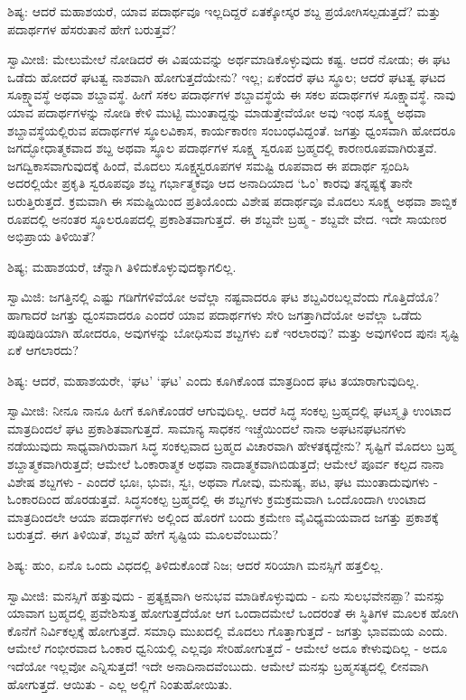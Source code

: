 ಶಿಷ್ಯ: ಆದರೆ ಮಹಾಶಯರೆ, ಯಾವ ಪದಾರ್ಥವೂ ಇಲ್ಲದಿದ್ದರೆ ಏತಕ್ಕೋಸ್ಕರ ಶಬ್ದ ಪ್ರಯೋಗಿಸಲ್ಪಡುತ್ತದೆ? ಮತ್ತು ಪದಾರ್ಥಗಳ ಹೆಸರುತಾನೆ ಹೇಗೆ ಬರುತ್ತವೆ?

ಸ್ವಾಮೀಜಿ: ಮೇಲುಮೇಲೆ ನೋಡಿದರೆ ಈ ವಿಷಯವನ್ನು ಅರ್ಥಮಾಡಿಕೊಳ್ಳುವುದು ಕಷ್ಟ. ಆದರೆ ನೋಡು; ಈ ಘಟ ಒಡೆದು ಹೋದರೆ ಘಟತ್ವ ನಾಶವಾಗಿ ಹೋಗುತ್ತದೆಯೇನು? ಇಲ್ಲ; ಏಕೆಂದರೆ ಘಟ ಸ್ಥೂಲ; ಆದರೆ ಘಟತ್ವ ಘಟದ ಸೂಕ್ಷ್ಮಾವಸ್ಥೆ ಅಥವಾ ಶಬ್ದಾವಸ್ಥೆ. ಹೀಗೆ ಸಕಲ ಪದಾರ್ಥಗಳ ಶಬ್ದಾವಸ್ಥೆಯೆ ಈ ಸಕಲ ಪದಾರ್ಥಗಳ ಸೂಕ್ಷ್ಮಾವಸ್ಥೆ. ನಾವು ಯಾವ ಪದಾರ್ಥಗಳನ್ನು ನೋಡಿ ಕೇಳಿ ಮುಟ್ಟಿ ಮುಂತಾದ್ದನ್ನು ಮಾಡುತ್ತೇವೆಯೋ ಅವು ಇಂಥ ಸೂಕ್ಷ್ಮ ಅಥವಾ ಶಬ್ದಾವಸ್ಥೆಯಲ್ಲಿರುವ ಪದಾರ್ಥಗಳ ಸ್ಥೂಲವಿಕಾಸ, ಕಾರ್ಯಕಾರಣ ಸಂಬಂಧವಿದ್ದಂತೆ. ಜಗತ್ತು ಧ್ವಂಸವಾಗಿ ಹೋದರೂ ಜಗದ್ಭೋಧಾತ್ಮಕವಾದ ಶಬ್ದ ಅಥವಾ ಸ್ಥೂಲ ಪದಾರ್ಥಗಳ ಸೂಕ್ಷ್ಮ ಸ್ವರೂಪ ಬ್ರಹ್ಮದಲ್ಲಿ ಕಾರಣರೂಪವಾಗಿರುತ್ತವೆ. ಜಗದ್ವಿಕಾಸವಾಗುವುದಕ್ಕೆ ಹಿಂದೆ, ಮೊದಲು ಸೂಕ್ಷ್ಮಸ್ವರೂಪಗಳ ಸಮಷ್ಟಿ ರೂಪವಾದ ಈ ಪದಾರ್ಥ ಸ್ಪಂದಿಸಿ ಅದರಲ್ಲಿಯೇ ಪ್ರಕೃತಿ ಸ್ವರೂಪವೂ ಶಬ್ದ ಗರ್ಭಾತ್ಮಕವೂ ಆದ ಅನಾದಿಯಾದ ‘ಓಂ’ ಕಾರವು ತನ್ನಷ್ಟಕ್ಕೆ ತಾನೇ ಬರುತ್ತಿರುತ್ತದೆ. ಕ್ರಮವಾಗಿ ಈ ಸಮಷ್ಟಿಯಿಂದ ಪ್ರತಿಯೊಂದು ವಿಶೇಷ ಪದಾರ್ಥವೂ ಮೊದಲು ಸೂಕ್ಷ್ಮ ಅಥವಾ ಶಾಬ್ದಿಕ ರೂಪದಲ್ಲಿ ಅನಂತರ ಸ್ಥೂಲರೂಪದಲ್ಲಿ ಪ್ರಕಾಶಿತವಾಗುತ್ತದೆ. ಈ ಶಬ್ದವೇ ಬ್ರಹ್ಮ - ಶಬ್ದವೇ ವೇದ. ಇದೇ ಸಾಯಣರ ಅಭಿಪ್ರಾಯ ತಿಳಿಯಿತೆ?

ಶಿಷ್ಯ; ಮಹಾಶಯರೆ, ಚೆನ್ನಾಗಿ ತಿಳಿದುಕೊಳ್ಳುವುದಕ್ಕಾಗಲಿಲ್ಲ.

ಸ್ವಾಮಿಜಿ: ಜಗತ್ತಿನಲ್ಲಿ ಎಷ್ಟು ಗಡಿಗೆಗಳಿವೆಯೋ ಅವೆಲ್ಲಾ ನಷ್ಟವಾದರೂ ಘಟ ಶಬ್ದವಿರಬಲ್ಲವೆಂದು ಗೊತ್ತಿದೆಯೊ? ಹಾಗಾದರೆ ಜಗತ್ತು ಧ್ವಂಸವಾದರೂ ಎಂದರೆ ಯಾವ ಪದಾರ್ಥಗಳು ಸೇರಿ ಜಗತ್ತಾಗಿದೆಯೋ ಅವೆಲ್ಲಾ ಒಡೆದು ಪುಡಿಪುಡಿಯಾಗಿ ಹೋದರೂ, ಅವುಗಳನ್ನು ಬೋಧಿಸುವ ಶಬ್ದಗಳು ಏಕೆ ಇರಲಾರವು? ಮತ್ತು ಅವುಗಳಿಂದ ಪುನಃ ಸೃಷ್ಟಿ ಏಕೆ ಆಗಲಾರದು?

ಶಿಷ್ಯ: ಆದರೆ, ಮಹಾಶಯರೇ, ‘ಘಟ’ ‘ಘಟ’ ಎಂದು ಕೂಗಿಕೊಂಡ ಮಾತ್ರದಿಂದ ಘಟ ತಯಾರಾಗುವುದಿಲ್ಲ.

ಸ್ವಾಮೀಜಿ: ನೀನೂ ನಾನೂ ಹೀಗೆ ಕೂಗಿಕೊಂಡರೆ ಆಗುವುದಿಲ್ಲ. ಆದರೆ ಸಿದ್ಧ ಸಂಕಲ್ಪ ಬ್ರಹ್ಮದಲ್ಲಿ ಘಟಸ್ಮೃತಿ ಉಂಟಾದ ಮಾತ್ರದಿಂದಲೆ ಘಟ ಪ್ರಕಾಶಿತವಾಗುತ್ತದೆ. ಸಾಮಾನ್ಯ ಸಾಧಕನ ಇಚ್ಚೆಯಿಂದಲೆ ನಾನಾ ಅಘಟನಘಟನಗಳು ನಡೆಯುವುದು ಸಾಧ್ಯವಾಗಿರುವಾಗ ಸಿದ್ಧ ಸಂಕಲ್ಪವಾದ ಬ್ರಹ್ಮದ ವಿಚಾರವಾಗಿ ಹೇಳತಕ್ಕದ್ದೇನು? ಸೃಷ್ಟಿಗೆ ಮೊದಲು ಬ್ರಹ್ಮ ಶಬ್ದಾತ್ಮಕವಾಗಿರುತ್ತದೆ; ಆಮೇಲೆ ಓಂಕಾರಾತ್ಮಕ ಅಥವಾ ನಾದಾತ್ಮಕವಾಗಿಬಿಡುತ್ತದೆ; ಆಮೇಲೆ ಪೂರ್ವ ಕಲ್ಪದ ನಾನಾ ವಿಶೇಷ ಶಬ್ದಗಳು - ಎಂದರೆ ಭೂಃ, ಭುವಃ, ಸ್ವಃ, ಅಥವಾ ಗೋವು, ಮನುಷ್ಯ, ಪಟ, ಘಟ ಮುಂತಾದುವುಗಳು - ಓಂಕಾರದಿಂದ ಹೊರಡುತ್ತವೆ. ಸಿದ್ಧಸಂಕಲ್ಪ ಬ್ರಹ್ಮದಲ್ಲಿ ಈ ಶಬ್ದಗಳು ಕ್ರಮಕ್ರಮವಾಗಿ ಒಂದೊಂದಾಗಿ ಉಂಟಾದ ಮಾತ್ರದಿಂದಲೇ ಆಯಾ ಪದಾರ್ಥಗಳು ಅಲ್ಲಿಂದ ಹೊರಗೆ ಬಂದು ಕ್ರಮೇಣ ವೈವಿಧ್ಯಮಯವಾದ ಜಗತ್ತು ಪ್ರಕಾಶಕ್ಕೆ ಬರುತ್ತದೆ. ಈಗ ತಿಳಿಯಿತೆ, ಶಬ್ದವೆ ಹೇಗೆ ಸೃಷ್ಟಿಯ ಮೂಲವೆಂಬುದು?

ಶಿಷ್ಯ: ಹುಂ, ಏನೊ ಒಂದು ವಿಧದಲ್ಲಿ ತಿಳಿದುಕೊಂಡೆ ನಿಜ; ಆದರೆ ಸರಿಯಾಗಿ ಮನಸ್ಸಿಗೆ ಹತ್ತಲಿಲ್ಲ.

ಸ್ವಾಮೀಜಿ: ಮನಸ್ಸಿಗೆ ಹತ್ತುವುದು - ಪ್ರತ್ಯಕ್ಷವಾಗಿ ಅನುಭವ ಮಾಡಿಕೊಳ್ಳುವುದು - ಏನು ಸುಲಭವೇನಪ್ಪಾ? ಮನಸ್ಸು ಯಾವಾಗ ಬ್ರಹ್ಮದಲ್ಲಿ ಪ್ರವೇಶಿಸುತ್ತ ಹೋಗುತ್ತದೆಯೋ ಆಗ ಒಂದಾದಮೇಲೆ ಒಂದರಂತೆ ಈ ಸ್ಥಿತಿಗಳ ಮೂಲಕ ಹೋಗಿ ಕೊನೆಗೆ ನಿರ್ವಿಕಲ್ಪಕ್ಕೆ ಹೋಗುತ್ತದೆ. ಸಮಾಧಿ ಮುಖದಲ್ಲಿ ಮೊದಲು ಗೊತ್ತಾಗುತ್ತದೆ - ಜಗತ್ತು ಭಾವಮಯ ಎಂದು. ಆಮೇಲೆ ಗಂಭೀರವಾದ ಓಂಕಾರ ಧ್ವನಿಯಲ್ಲಿ ಎಲ್ಲವೂ ಸೇರಿಹೋಗುತ್ತದೆ - ಆಮೇಲೆ ಅದೂ ಕೇಳುವುದಿಲ್ಲ - ಅದೂ ಇದೆಯೋ ಇಲ್ಲವೋ ಎನ್ನಿಸುತ್ತದೆ! ಇದೇ ಅನಾದಿನಾದವೆಂಬುದು. ಆಮೇಲೆ ಮನಸ್ಸು ಬ್ರಹ್ಮಸತ್ಯದಲ್ಲಿ ಲೀನವಾಗಿ ಹೋಗುತ್ತದೆ. ಆಯಿತು - ಎಲ್ಲ ಅಲ್ಲಿಗೆ ನಿಂತುಹೋಯಿತು.

